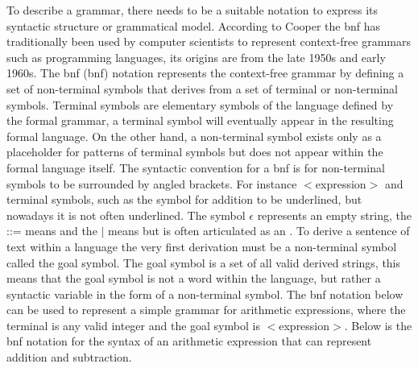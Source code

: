 To describe a grammar, there needs to be a suitable notation to express its syntactic structure or grammatical model. According to Cooper the \acrshort{bnf} has traditionally been used by computer scientists to represent context-free grammars such as programming languages, its origins are from the late 1950s and early 1960s. The \acrlong{bnf} (\acrshort{bnf}) notation represents the context-free grammar by defining a set of non-terminal symbols that derives from a set of terminal or non-terminal symbols. Terminal symbols are elementary symbols of the language defined by the formal grammar, a terminal symbol will eventually appear in the resulting formal language. On the other hand, a non-terminal symbol exists only as a placeholder for patterns of terminal symbols but does not appear within the formal language itself. The syntactic convention for a \acrshort{bnf} is for non-terminal symbols to be surrounded by angled brackets. For instance $<$expression$>$ and terminal symbols, such as the symbol for addition \say{+} to be underlined, but nowadays it is not often underlined. The symbol $\epsilon$ represents an empty string, the ::= means  and the $\mid$ means  but is often articulated as an  \cite{cooper2011engineering}. To derive a sentence of text within a language the very first derivation must be a non-terminal symbol called the goal symbol. The goal symbol is a set of all valid derived strings, this means that the goal symbol is not a word within the language, but rather a syntactic variable in the form of a non-terminal symbol. The \acrshort{bnf} notation below can be used to represent a simple grammar for arithmetic expressions, where the terminal  is any valid integer and the goal symbol is $<$expression$>$. Below is the \acrshort{bnf} notation for the syntax of an arithmetic expression that can represent addition and subtraction.

\noindent
\begin{algorithm}
\begin{bnf*}
		{}\\
		\\
		\\
\end{bnf*}
\end{algorithm}
\FloatBarrier

